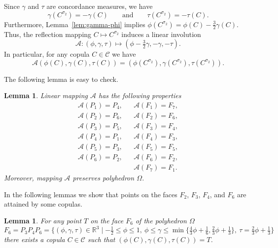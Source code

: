 \documentclass[12pt,a4paper]{amsart}
\newtheorem{lemma}[theorem]{Lemma}
\theoremstyle{definition}
\newcommand{\RR}{\mathbb{R}}
\newcommand{\CC}{\mathcal{C}}
\begin{document}
Since $\gamma$ and $\tau$ are concordance measures, we have $$\gamma(C^{\sigma_2})=-\gamma(C) \qquad \text{and} \qquad \tau(C^{\sigma_2})=-\tau(C).$$
Furthermore, Lemma~\ref{lem:gamma-phi} implies $\phi(C^{\sigma_2})=\phi(C)-\tfrac32 \gamma(C)$. Thus, the reflection mapping $C \mapsto C^{\sigma_2}$ induces a linear involution
$$\mathcal{A}\colon (\phi, \gamma, \tau) \mapsto (\phi - \tfrac32 \gamma, -\gamma, -\tau).$$
In particular, for any copula $C\in \CC$ we have
\begin{equation}\label{eq:mappingA}
  \mathcal{A}(\phi(C), \gamma(C), \tau(C)) = (\phi(C^{\sigma_2}), \gamma(C^{\sigma_2}), \tau(C^{\sigma_2})).  
\end{equation}

The following lemma is easy to check.
\begin{lemma}\label{lem:linear_map_A}
Linear mapping $\mathcal{A}$ has the following properties
\begin{align*}
\mathcal{A}(P_1)=P_4, && \mathcal{A}(F_1)=F_7,\\
\mathcal{A}(P_2)=P_6, && \mathcal{A}(F_2)=F_6,\\
\mathcal{A}(P_3)=P_5, && \mathcal{A}(F_3)=F_4,\\
\mathcal{A}(P_4)=P_1, && \mathcal{A}(F_4)=F_3,\\
\mathcal{A}(P_5)=P_3, && \mathcal{A}(F_5)=F_5,\\
\mathcal{A}(P_6)=P_2, && \mathcal{A}(F_6)=F_2, \\
&& \mathcal{A}(F_7)=F_1.
\end{align*}
Moreover, mapping $\mathcal{A}$ preserves polyhedron $\Omega$.
\end{lemma}

In the following lemmas we show that points on the faces $F_2$, $F_3$, $F_4$, and $F_6$ are attained by some copulas.

\begin{lemma}\label{lem:F6}
For any point $T$ on the face $F_6$ of the polyhedron $\Omega$
$$F_6 = P_3P_4P_6 = \big\{(\phi, \gamma, \tau) \in \RR^3 \mid -\tfrac12 \le \phi \le 1,\ \phi \le \gamma \le \min\{\tfrac43 \phi+\tfrac16, \tfrac23 \phi+\tfrac13\},\ \tau = \tfrac23\phi+\tfrac13\big\}$$
there exists a copula $C\in\CC$ such that $(\phi(C), \gamma(C), \tau(C)) = T$.
\end{lemma}
\end{document}
